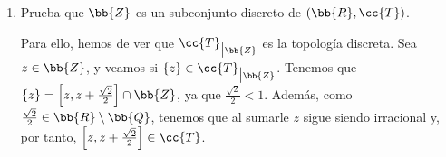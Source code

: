 \begin{ejercicio}
\begin{enumerate}[label=\alph*)]
        Veamos en primer lugar que $[0,1[$ es cerrado. Tenemos que su complementario es $\bb{R}\setminus [0,1[~=]-\infty, 0[~\cup~[1,+\infty[$. El primer intervalo es un abierto en $\cc{T}_u\subset \cc{T}$. Respecto al segundo, tenemos que:
        \begin{equation*}
            [1,+\infty[~=\bigcup_{\substack{b\in \bb{R}\setminus\bb{Q}\\b>1}}[1,b]\in \cc{T}
        \end{equation*}
        Por tanto, tenemos que el segundo intervalo es una unión (no numerable) de abiertos, por lo que es un abierto. Por tanto, $\bb{R}\setminus [0,1[~\in \cc{T}$, por lo que $[0,1[$ es un cerrado y, por tanto, $\ol{[0,1[}=[0,1[$.
        

        Además, tenemos que $[0,1[~=\bigcup\limits_{\substack{b\in \bb{R}\setminus\bb{Q}\\0<b<1}}[0,b]\in \cc{T}$, por lo que es un abierto y, por tanto, $[0,1[^\circ = [0,1[$.\\


        Trabajamos ahora con $[0,\sqrt{2}]$. Como $\cc{T}_u\subset \cc{T}$, tenemos que $C_{\cc{T}_u}\subset C_{\cc{T}}$. Por tanto, tenemos que $[0,\sqrt{2}]\in C_\cc{T}$, por lo que $\ol{[0,\sqrt{2}]}=[0,\sqrt{2}]$.

        Además, tenemos que es un abierto básico, por lo que $[0,\sqrt{2}]^\circ = [0,\sqrt{2}]$.\\

        Veamos ahora la clausura de $\bb{Q}$. Como los abiertos básicos son intervalos, tenemos que $\bb{Q}\cap B\neq \emptyset$, para todo $B\in \cc{B}$ intervalo y por la densidad de $\bb{Q}$ en $\bb{R}$. Por tanto, como esto es cierto $\forall x\in X$, tenemos que $\ol{Q}=\bb{R}$.

        De igual forma, por la densidad de $\bb{R}\setminus\bb{Q}$ en $\bb{R}$, tenemos que $\nexists B\in \cc{B}$ tal que $B\subset \bb{Q}$. Por tanto, $[\bb{Q}]^\circ = \emptyset$.

        \item Prueba que $\bb{Z}$ es un subconjunto discreto de $(\bb{R},\cc{T})$.

        Para ello, hemos de ver que $\cc{T}_{\big| \bb{Z}}$ es la topología discreta. Sea $z\in \bb{Z}$, y veamos si $\{z\}\in \cc{T}_{\big| \bb{Z}}$. Tenemos que $\{z\}=\left[z,z+\frac{\sqrt{2}}{2}\right]\cap \bb{Z}$, ya que $\frac{\sqrt{2}}{2}<1$. Además, como $\frac{\sqrt{2}}{2}\in \bb{R}\setminus\bb{Q}$, tenemos que al sumarle $z$ sigue siendo irracional y, por tanto, $\left[z,z+\frac{\sqrt{2}}{2}\right]\in \cc{T}$.


\end{enumerate}
\end{ejercicio}
